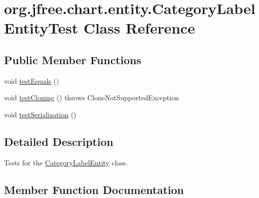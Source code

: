 \hypertarget{classorg_1_1jfree_1_1chart_1_1entity_1_1_category_label_entity_test}{}\section{org.\+jfree.\+chart.\+entity.\+Category\+Label\+Entity\+Test Class Reference}
\label{classorg_1_1jfree_1_1chart_1_1entity_1_1_category_label_entity_test}
\subsection*{Public Member Functions}
\begin{DoxyCompactItemize}
\item 
void \mbox{\hyperlink{classorg_1_1jfree_1_1chart_1_1entity_1_1_category_label_entity_test_a4189789dbe30344ee6badfac26b5dc33}{test\+Equals}} ()
\item 
void \mbox{\hyperlink{classorg_1_1jfree_1_1chart_1_1entity_1_1_category_label_entity_test_a70d0255298eac3c67b11a8581b9609d4}{test\+Cloning}} ()  throws Clone\+Not\+Supported\+Exception 
\item 
void \mbox{\hyperlink{classorg_1_1jfree_1_1chart_1_1entity_1_1_category_label_entity_test_ad4f229bcfe21cb933a749d16bfe912a7}{test\+Serialization}} ()
\end{DoxyCompactItemize}


\subsection{Detailed Description}
Tests for the \mbox{\hyperlink{classorg_1_1jfree_1_1chart_1_1entity_1_1_category_label_entity}{Category\+Label\+Entity}} class. 

\subsection{Member Function Documentation}
\mbox{\label{classorg_1_1jfree_1_1chart_1_1entity_1_1_category_label_entity_test_a70d0255298eac3c67b11a8581b9609d4}} 
